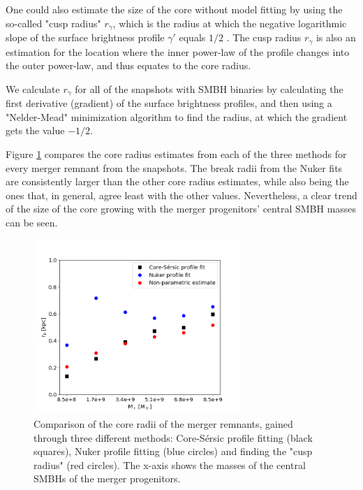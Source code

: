 \documentclass[english, oneside]{HYgradu}
\begin{document}
One could also estimate the size of the core without model fitting by using the so-called "cusp radius" $r_\gamma$, which is the radius at which the negative logarithmic slope of the surface brightness profile $\gamma'$ equals $1/2$ \citep{Carollo1997, Lauer2007Cusp}. The cusp radius $r_\gamma$ is also an estimation for the location where the inner power-law of the profile changes into the outer power-law, and thus equates to the core radius. 

We calculate $r_\gamma$ for all of the snapshots with SMBH binaries by calculating the first derivative (gradient) of the surface brightness profiles, and then using a "Nelder-Mead" minimization algorithm to find the radius, at which the gradient gets the value $-1/2$. 

Figure \ref{figure:radii_comparison} compares the core radius estimates from each of the three methods for every merger remnant from the snapshots. The break radii from the Nuker fits are consistently larger than the other core radius estimates, while also being the ones that, in general, agree least with the other values. Nevertheless, a clear trend of the size of the core growing with the merger progenitors' central SMBH masses can be seen.

\begin{figure}[h]
	\centering
	\includegraphics[width=0.7\textwidth]{rb_mass_relation.png}
	\caption{Comparison of the core radii of the merger remnants, gained through three different methods: Core-Sérsic profile fitting (black squares), Nuker profile fitting (blue circles) and  finding the "cusp radius" (red circles). The x-axis shows the masses of the central SMBHs of the merger progenitors.}
	\label{figure:radii_comparison}
\end{figure}
\end{document}
